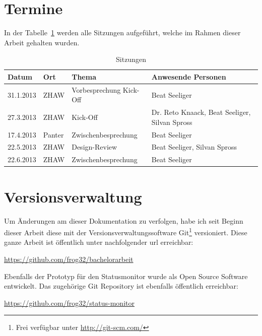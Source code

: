 \section{Termine}
\label{sec:termine}
In der Tabelle~\ref{tab:sitzungen} werden alle Sitzungen aufgeführt, welche im Rahmen dieser Arbeit gehalten wurden.

\begin{table}[h]
  \centering
  \begin{tabular}{lll p{7cm}}
  \toprule
    Datum & Ort & Thema & Anwesende Personen\\
  \hline
    31.1.2013 & ZHAW & Vorbesprechung Kick-Off & Beat Seeliger\\
  \hline
    27.3.2013 & ZHAW & Kick-Off & Dr. Reto Knaack, Beat Seeliger, Silvan Spross\\
  \hline
    17.4.2013 & Panter & Zwischenbesprechung & Beat Seeliger\\
  \hline
    22.5.2013 & ZHAW & Design-Review & Beat Seeliger, Silvan Spross\\
  \hline
    22.6.2013 & ZHAW & Zwischenbesprechung & Beat Seeliger\\
  \bottomrule
  \end{tabular}
  \caption{Sitzungen}
  \label{tab:sitzungen}
\end{table}

\section{Versionsverwaltung}
\label{sec:versionsverwaltung}
Um Änderungen am dieser Dokumentation zu verfolgen, habe ich seit Beginn dieser Arbeit diese mit der Versionsverwaltungssoftware Git\footnote{Frei verfügbar unter \url{http://git-scm.com/}} versioniert. Diese ganze Arbeit ist öffentlich unter nachfolgender \acrshort{url} erreichbar:

\url{https://github.com/frog32/bachelorarbeit}

Ebenfalls der Prototyp für den Statusmonitor wurde als Open Source Software entwickelt. Das zugehörige Git Repository ist ebenfalls öffentlich erreichbar:

\url{https://github.com/frog32/status-monitor}

